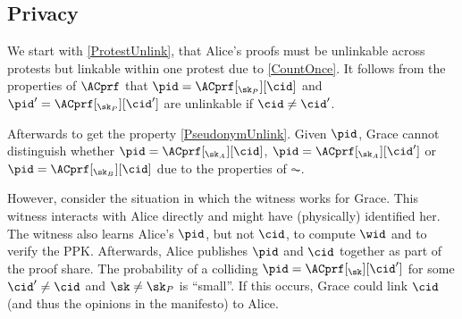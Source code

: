 \subsection{Privacy}

We start with \cref{ProtestUnlink}, that Alice's proofs must be unlinkable across protests but linkable within one protest due to \cref{CountOnce}.
It follows from the properties of \(\ACprf\) that \(\pid =  \ACprf[_{\sk_P}][\cid]\) and \(\pid' = \ACprf[_{\sk_P}][\cid']\) are unlinkable if \(\cid\neq \cid'\).

Afterwards to get the property \cref{PseudonymUnlink}.
Given \(\pid\), Grace cannot distinguish whether \(\pid = \ACprf[_{\sk_A}][\cid]\), \(\pid = \ACprf[_{\sk_A}][\cid']\) or \(\pid = \ACprf[_{\sk_B}][\cid]\) due to the properties of \(\AC\).

However, consider the situation in which the witness works for Grace.
This witness interacts with Alice directly and might have (physically) identified her.
The witness also learns Alice's \(\pid\), but not \(\cid\), to compute \(\wid\) and to verify the \ac{PPK}.
Afterwards, Alice publishes \(\pid\) and \(\cid\) together as part of the proof 
share.
The probability of a colliding \(\pid = \ACprf[_\sk][\cid']\) for some \(\cid' 
  \neq \cid\) and \(\sk \neq \sk_P\) is \enquote{small}.
If this occurs, Grace could link \(\cid\) (and thus the opinions in the manifesto) to Alice.

